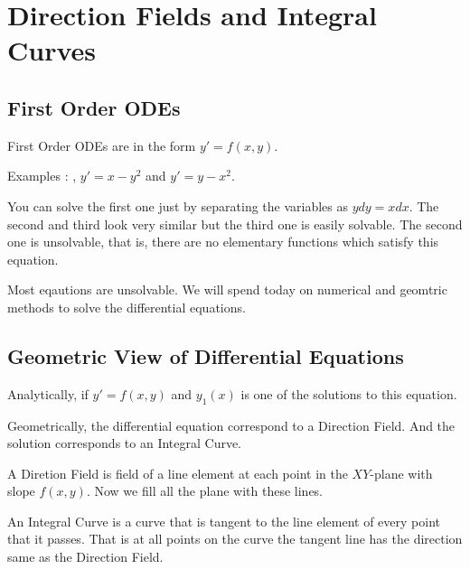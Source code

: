 

\chapter{Direction Fields and Integral Curves}  

\bigbreak
\section{First Order ODEs}

First Order ODEs are in the form $y' = f(x, y)$.

Examples : , $y ' = x - y^2$ and $y' = y - x^2$.

You can solve the first one just by separating the variables as $y dy = x dx$.
The second and third look very similar but the third one is easily solvable.
The second one is unsolvable, that is, there are no elementary functions which satisfy this equation.

Most eqautions are unsolvable. We will spend today on numerical and geomtric methods to solve the differential equations.

\section{Geometric View of Differential Equations}

Analytically, if $y' = f(x, y)$ and $y_1(x)$ is one of the solutions to this equation.

Geometrically, the differential equation correspond to a Direction Field.
And the solution corresponds to an Integral Curve.

A Diretion Field is field of a line element at each point in the $XY$-plane with slope $f(x, y)$.
Now we fill all the plane with these lines.

An Integral Curve is a curve that is tangent to the line element of every point that it passes.
That is at all points on the curve the tangent line has the direction same as the Direction Field.

